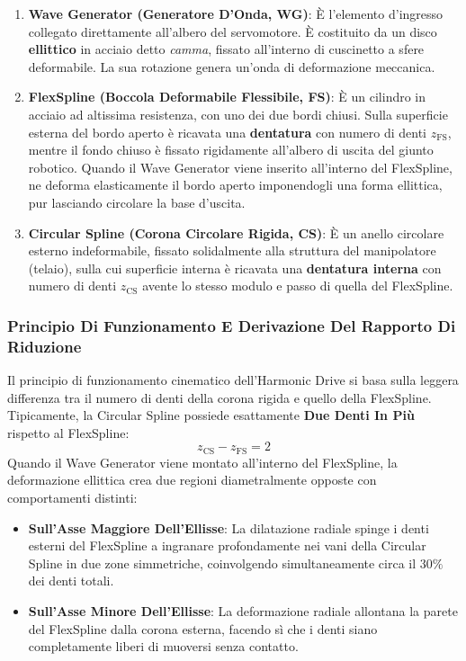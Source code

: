 ﻿\documentclass[11pt, a4paper]{article}
\begin{document}
\begin{enumerate}
    \item \textbf{Wave Generator (Generatore D'Onda, WG)}: È l'elemento d'ingresso collegato direttamente all'albero del servomotore. È costituito da un disco \textbf{ellittico} in acciaio detto \textit{camma}, fissato all'interno di cuscinetto a sfere deformabile. La sua rotazione genera un'onda di deformazione meccanica.
    \item \textbf{FlexSpline (Boccola Deformabile Flessibile, FS)}: È un cilindro in acciaio ad altissima resistenza, con uno dei due bordi chiusi. Sulla superficie esterna del bordo aperto è ricavata una \textbf{dentatura} con numero di denti $z_{\text{FS}}$, mentre il fondo chiuso è fissato rigidamente all'albero di uscita del giunto robotico. Quando il Wave Generator viene inserito all'interno del FlexSpline, ne deforma elasticamente il bordo aperto imponendogli una forma ellittica, pur lasciando circolare la base d'uscita.
    \item \textbf{Circular Spline (Corona Circolare Rigida, CS)}: È un anello circolare esterno indeformabile, fissato solidalmente alla struttura del manipolatore (telaio), sulla cui superficie interna è ricavata una \textbf{dentatura interna} con numero di denti $z_{\text{CS}}$ avente lo stesso modulo e passo di quella del FlexSpline.
\end{enumerate}

\newpage

\subsubsection{Principio Di Funzionamento E Derivazione Del Rapporto Di Riduzione}
Il principio di funzionamento cinematico dell'Harmonic Drive si basa sulla leggera differenza tra il numero di denti della corona rigida e quello della FlexSpline. Tipicamente, la Circular Spline possiede esattamente \textbf{Due Denti In Più} rispetto al FlexSpline:
\[
    z_{\text{CS}} - z_{\text{FS}} = 2
    \label{eq:differenza_denti_hd}
\]
Quando il Wave Generator viene montato all'interno del FlexSpline, la deformazione ellittica crea due regioni diametralmente opposte con comportamenti distinti:
\begin{itemize}
    \item \textbf{Sull'Asse Maggiore Dell'Ellisse}: La dilatazione radiale spinge i denti esterni del FlexSpline a ingranare profondamente nei vani della Circular Spline in due zone simmetriche, coinvolgendo simultaneamente circa il $30\%$ dei denti totali.
    \item \textbf{Sull'Asse Minore Dell'Ellisse}: La deformazione radiale allontana la parete del FlexSpline dalla corona esterna, facendo sì che i denti siano completamente liberi di muoversi senza contatto.
\end{itemize}
\end{document}
